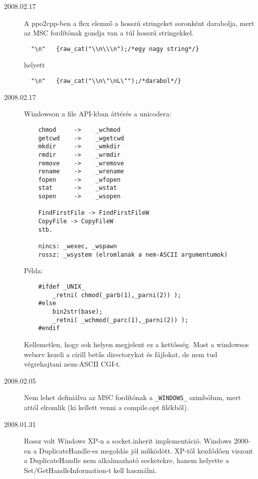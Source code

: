 
\begin{description}

\item[2008.02.17]
  A ppo2cpp-ben a flex elemző a hosszú stringeket soronként darabolja,
  mert az MSC fordítónak gondja van a túl hosszú stringekkel.

\begin{verbatim}
  "\n"   {raw_cat("\\n\\\n");/*egy nagy string*/}
\end{verbatim}
  
  helyett

\begin{verbatim}
  "\n"   {raw_cat("\\n\"\nL\"");/*darabol*/}
\end{verbatim}

\item[2008.02.17]
  Windowson a file API-kban áttérés a unicodera:
\begin{verbatim}
    chmod     ->    _wchmod  
    getcwd    ->    _wgetcwd 
    mkdir     ->    _wmkdir  
    rmdir     ->    _wrmdir  
    remove    ->    _wremove 
    rename    ->    _wrename 
    fopen     ->    _wfopen  
    stat      ->    _wstat   
    sopen     ->    _wsopen  

    FindFirstFile -> FindFirstFileW
    CopyFile -> CopyFileW
    stb.
      
    nincs: _wexec, _wspawn 
    rossz: _wsystem (elromlanak a nem-ASCII argumentumok)
\end{verbatim}
    
  Példa:

\begin{verbatim}
    #ifdef _UNIX_
        _retni( chmod(_parb(1),_parni(2)) );
    #else
        bin2str(base);
        _retni( _wchmod(_parc(1),_parni(2)) );
    #endif
\end{verbatim}

  Kellemetlen, hogy sok helyen megjelent ez a kettősség.
  Most a windowsos websrv kezeli a cirill betűs directorykat
  és fájlokat, de nem tud végrehajtani nem-ASCII CGI-t.

\item[2008.02.05]
  Nem lehet definiálva az MSC fordítónak a \verb!_WINDOWS_! szimbólum, 
  mert attól elromlik (ki kellett venni a compile.opt filékből).

\item[2008.01.31]
  Rossz volt Windows XP-n a socket.inherit implementáció.
  Windows 2000-en a DuplicateHandle-es megoldás jól működött.
  XP-től kezdődően viszont a DuplicateHandle nem alkalmazható socketekre,
  hanem helyette a Set/GetHandleInformation-t kell használni.


\end{description}
